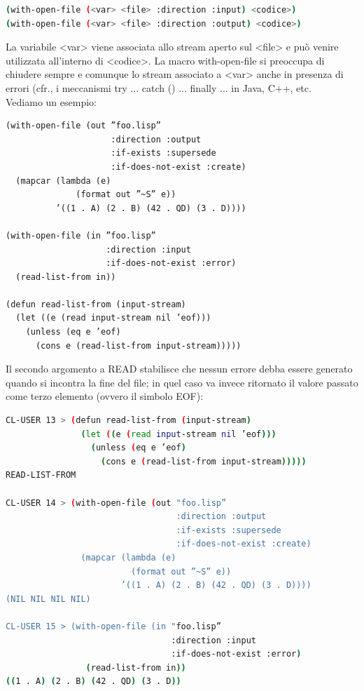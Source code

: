 \documentclass[a4paper,12pt, oneside]{book}
\begin{document}
\begin{shaded}
\begin{lstlisting}[language=bash]
(with-open-file (<var> <file> :direction :input) <codice>)
(with-open-file (<var> <file> :direction :output) <codice>)
\end{lstlisting}
\end{shaded}
La variabile <var> viene associata allo stream aperto sul <file> e può venire
utilizzata all’interno di <codice>. La macro with-open-file si preoccupa di chiudere sempre e comunque lo
stream associato a <var> anche in presenza di errori (cfr., i meccanismi try
{...} catch () {...} finally {...} in Java, C++, etc. \\
Vediamo un esempio:
\begin{verbatim}
(with-open-file (out ”foo.lisp”
                     :direction :output
                     :if-exists :supersede
                     :if-does-not-exist :create)
  (mapcar (lambda (e)
              (format out ”~S” e))
          ’((1 . A) (2 . B) (42 . QD) (3 . D))))
          
(with-open-file (in ”foo.lisp”
                    :direction :input
                    :if-does-not-exist :error)
  (read-list-from in))
  
(defun read-list-from (input-stream)
  (let ((e (read input-stream nil ’eof)))
    (unless (eq e ’eof)
      (cons e (read-list-from input-stream)))))
\end{verbatim}
Il secondo argomento a READ stabilisce che nessun errore debba essere generato quando
si incontra la fine del file; in quel caso va invece ritornato il valore passato come terzo
elemento (ovvero il simbolo EOF):
\begin{shaded}
\begin{lstlisting}[language=bash]
CL-USER 13 > (defun read-list-from (input-stream)
               (let ((e (read input-stream nil ’eof)))
                 (unless (eq e ’eof)
                   (cons e (read-list-from input-stream)))))
READ-LIST-FROM

CL-USER 14 > (with-open-file (out "foo.lisp”
                                  :direction :output
                                  :if-exists :supersede
                                  :if-does-not-exist :create)
               (mapcar (lambda (e)
                         (format out ”~S” e))
                       ’((1 . A) (2 . B) (42 . QD) (3 . D))))
(NIL NIL NIL NIL)

CL-USER 15 > (with-open-file (in "foo.lisp”
                                 :direction :input
                                 :if-does-not-exist :error)
                (read-list-from in))
((1 . A) (2 . B) (42 . QD) (3 . D))
\end{lstlisting}
\end{shaded}
\end{document}
